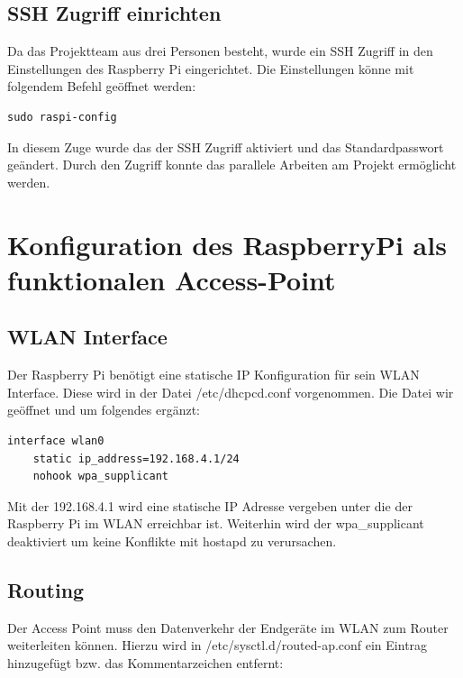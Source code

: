 \documentclass[a4paper,11pt,singlespacing]{article}
\begin{document}
    	
    	\subsection{SSH Zugriff einrichten}
    	Da das Projektteam aus drei Personen besteht, wurde ein SSH Zugriff in den Einstellungen des Raspberry Pi eingerichtet. Die Einstellungen könne mit folgendem Befehl geöffnet werden: 
        \begin{lstlisting}
sudo raspi-config
        \end{lstlisting} 
    	
        In diesem Zuge wurde das der SSH Zugriff aktiviert und das Standardpasswort geändert. Durch den  Zugriff konnte das parallele Arbeiten am Projekt ermöglicht werden. 
    	\section{Konfiguration des RaspberryPi als funktionalen Access-Point}
            \subsection{WLAN Interface}
                Der Raspberry Pi benötigt eine statische IP Konfiguration für sein WLAN Interface. Diese wird in der Datei /etc/dhcpcd.conf vorgenommen. Die Datei wir geöffnet und um folgendes ergänzt:\\
                \lstset{
                language=bash,
                }
                \begin{lstlisting}
interface wlan0
    static ip_address=192.168.4.1/24
    nohook wpa_supplicant
                \end{lstlisting} 
                Mit der 192.168.4.1 wird eine statische IP Adresse vergeben unter die der Raspberry Pi im WLAN erreichbar ist. Weiterhin wird der wpa{\_}supplicant deaktiviert um keine Konflikte mit hostapd zu verursachen. 
            
            \subsection{Routing}
                Der Access Point muss den Datenverkehr der Endgeräte im WLAN zum Router weiterleiten können.
                Hierzu wird in /etc/sysctl.d/routed-ap.conf ein Eintrag hinzugefügt bzw. das Kommentarzeichen entfernt:\\
                \lstset{
                language=bash,
                }
\end{document}
